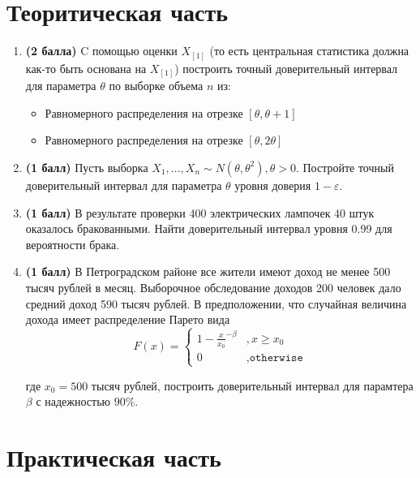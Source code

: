 \documentclass{assignment}
\begin{document}


\section*{Теоритическая часть}
\begin{enumerate}
    \item \textbf{(2 балла)} C помощью оценки $X_{[1]}$ (то есть центральная статистика должна как-то быть основана на $X_{[1]}$) построить точный доверительный интервал для параметра $\theta$ по выборке объема $n$ из:
    \begin{itemize}
        \item Равномерного распределения на отрезке $[\theta, \theta + 1]$
        \item Равномерного распределения на отрезке $[\theta, 2\theta]$       
    \end{itemize}

    \item \textbf{(1 балл)} Пусть выборка $X_1, \ldots, X_n \sim N(\theta, \theta^2), \theta > 0$. Постройте точный доверительный интервал для параметра $\theta$ уровня доверия $1 - \varepsilon$.

    \item \textbf{(1 балл)} В результате проверки 400 электрических лампочек 40 штук оказалось бракованными. Найти доверительный интервал уровня 0.99 для вероятности брака.

    \item \textbf{(1 балл)} В Петроградском районе все жители имеют доход не менее 500 тысяч рублей в месяц. Выборочное обследование доходов 200 человек дало средний доход 590 тысяч рублей. В предположении, что случайная величина дохода имеет распределение Парето вида 
    $$F(x)=
    \begin{cases}
        \displaystyle 1 - \frac{x}{x_0}^{-\beta} &, x \geq x_0 \\
        0 &, \texttt{otherwise} 
    \end{cases}    
    $$

    где $x_0 = 500$ тысяч рублей, построить доверительный интервал для парамтера $\beta$ с надежностью $90\%$.
\end{enumerate}

\newpage
\section*{Практическая часть}
\end{document}
